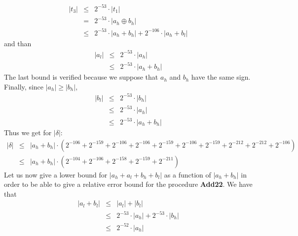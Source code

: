 \documentclass[a4paper,10pt,twoside]{article}
\newenvironment{proof}[1][Proof]{\begin{trivlist}
\item[\hskip \labelsep {\bfseries #1}]}{\end{trivlist}}
\newcommand{\hi}{\ensuremath{\mathit{h}}}
\newcommand{\lo}{\ensuremath{\mathit{l}}}
\newcommand{\AddDD}{{\bf Add22}}
\begin{document}
\begin{proof}
\begin{eqnarray*}
\left \vert t_3 \right \vert & \leq & 2^{-53} \cdot \left \vert t_1 \right \vert \\
& = & 2^{-53} \cdot \left \vert a_\hi \oplus b_\hi \right \vert \\
& \leq & 2^{-53} \cdot \left \vert a_\hi + b_\hi \right \vert + 2^{-106} \cdot \left \vert a_\hi + b_\lo \right \vert
\end{eqnarray*}
and than
\begin{eqnarray*}
\left \vert a_\lo \right \vert & \leq & 2^{-53} \cdot \left \vert a_\hi \right \vert \\
& \leq & 2^{-53} \cdot \left \vert a_\hi + b_\hi \right \vert
\end{eqnarray*}
The last bound is verified because we suppose that $a_\hi$ and $b_\hi$ have the
same sign. \\
Finally, since $\left \vert a_\hi \right \vert \geq \left \vert b_\hi \right \vert$,
\begin{eqnarray*}
\left \vert b_\lo \right \vert & \leq & 2^{-53} \cdot \left \vert b_\hi \right \vert \\
& \leq & 2^{-53} \cdot \left \vert a_\hi \right \vert \\
& \leq & 2^{-53} \cdot \left \vert a_\hi + b_\hi \right \vert
\end{eqnarray*}
Thus we get for $\left \vert \delta \right \vert$:
\begin{eqnarray*}
\left \vert \delta \right \vert & \leq & \left \vert a_\hi + b_\hi \right \vert \cdot \left(
                                         2^{-106} + 2^{-159} + 2^{-106} + 2^{-106} + 2^{-159} +
                                         2^{-106} + 2^{-159} + 2^{-212} + 2^{-212} + 2^{-106} \right) \\
& \leq & \left \vert a_\hi + b_\hi \right \vert \cdot \left( 2^{-104} + 2^{-106} + 2^{-158} + 2^{-159} + 2^{-211} \right)
\end{eqnarray*}
Let us now give a lower bound for $\left \vert a_\hi + a_\lo + b_\hi + b_\lo
\right \vert$ as a function of $\left \vert a_\hi + b_\hi \right \vert$
in order to be able to give a relative error bound for the procedure
\AddDD. We have that
\begin{eqnarray*}
\left \vert a_\lo + b_\lo \right \vert & \leq & \left \vert a_\lo \right \vert + \left \vert b_\lo \right \vert \\
& \leq & 2^{-53} \cdot \left \vert a_\hi \right \vert + 2^{-53} \cdot \left \vert b_\hi \right \vert \\
& \leq & 2^{-52} \cdot \left \vert a_\hi \right \vert \\

\end{eqnarray*}
\end{proof}
\end{document}

